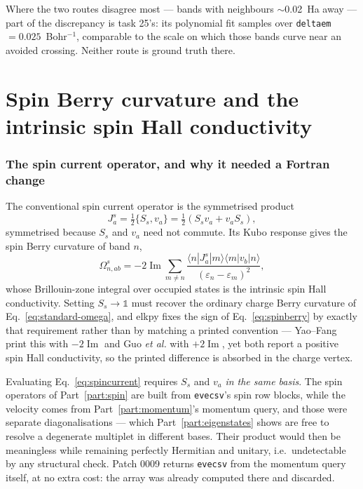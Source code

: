 \documentclass[11pt]{article}
\begin{document}
Where the two routes disagree most --- bands with neighbours $\sim$0.02~Ha away
--- part of the discrepancy is task 25's: its polynomial fit samples over
\texttt{deltaem}$=0.025$~Bohr$^{-1}$, comparable to the scale on which those
bands curve near an avoided crossing. Neither route is ground truth there.

\part{Spin Berry curvature and the intrinsic spin Hall conductivity}
\label{part:spinhall}

\section{The spin current operator, and why it needed a Fortran change}

The conventional spin current operator is the symmetrised product
\begin{equation}
  J^{s}_{a}=\tfrac12\{S_s,v_a\}=\tfrac12\left(S_s v_a+v_a S_s\right),
  \label{eq:spincurrent}
\end{equation}
symmetrised because $S_s$ and $v_a$ need not commute. Its Kubo response gives
the spin Berry curvature of band $n$,
\begin{equation}
  \Omega^{s}_{n,ab}=-2\operatorname{Im}\sum_{m\neq n}
    \frac{\langle n|J^{s}_{a}|m\rangle\langle m|v_b|n\rangle}
         {(\varepsilon_n-\varepsilon_m)^2},
  \label{eq:spinberry}
\end{equation}
whose Brillouin-zone integral over occupied states is the intrinsic spin Hall
conductivity. Setting $S_s\to\mathbb 1$ must recover the ordinary charge Berry
curvature of Eq.~\eqref{eq:standard-omega}, and elkpy fixes the sign of
Eq.~\eqref{eq:spinberry} by exactly that requirement rather than by matching a
printed convention --- Yao--Fang print this with $-2\operatorname{Im}$ and Guo
\emph{et al.} with $+2\operatorname{Im}$, yet both report a positive spin Hall
conductivity, so the printed difference is absorbed in the charge vertex.

Evaluating Eq.~\eqref{eq:spincurrent} requires $S_s$ and $v_a$ \emph{in the same
basis}. The spin operators of Part~\ref{part:spin} are built from
\texttt{evecsv}'s spin row blocks, while the velocity comes from
Part~\ref{part:momentum}'s momentum query, and those were separate
diagonalisations --- which Part~\ref{part:eigenstates} shows are free to resolve
a degenerate multiplet in different bases. Their product would then be
meaningless while remaining perfectly Hermitian and unitary, i.e.\ undetectable
by any structural check. Patch 0009 returns \texttt{evecsv} from the momentum
query itself, at no extra cost: the array was already computed there and
discarded.
\end{document}
